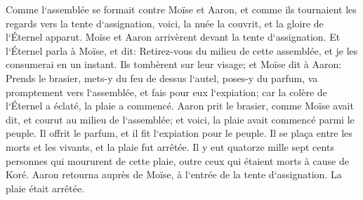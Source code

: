 \verse Comme l`assemblée se formait contre Moïse et Aaron, et comme ils tournaient les regards vers la tente d`assignation, voici, la nuée la couvrit, et la gloire de l`Éternel apparut. 
\verse Moïse et Aaron arrivèrent devant la tente d`assignation. 
\verse Et l`Éternel parla à Moïse, et dit: 
\verse Retirez-vous du milieu de cette assemblée, et je les consumerai en un instant. Ils tombèrent sur leur visage; 
\verse et Moïse dit à Aaron: Prends le brasier, mets-y du feu de dessus l`autel, poses-y du parfum, va promptement vers l`assemblée, et fais pour eux l`expiation; car la colère de l`Éternel a éclaté, la plaie a commencé. 
\verse Aaron prit le brasier, comme Moïse avait dit, et courut au milieu de l`assemblée; et voici, la plaie avait commencé parmi le peuple. Il offrit le parfum, et il fit l`expiation pour le peuple. 
\verse Il se plaça entre les morts et les vivants, et la plaie fut arrêtée. 
\verse Il y eut quatorze mille sept cents personnes qui moururent de cette plaie, outre ceux qui étaient morts à cause de Koré. 
\verse Aaron retourna auprès de Moïse, à l`entrée de la tente d`assignation. La plaie était arrêtée. 

